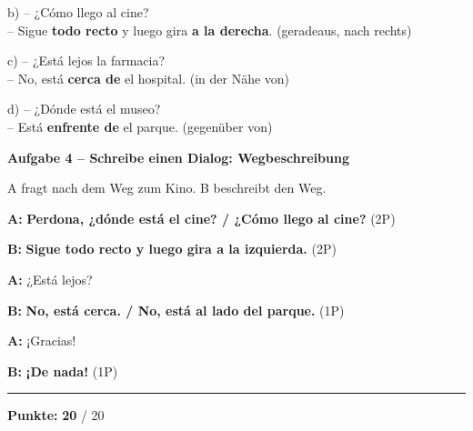 \documentclass[11pt, a4paper]{article}
\newcommand{\fachfarbe}{spanisch}
\newcommand{\maxpunkte}{20}
\newcommand{\punktebox}[1]{\hfill\fbox{\small \_/#1}}
\newcommand{\lsg}[1]{\textcolor{loesung}{\textbf{#1}}}
\newenvironment{aufgabe}[1]{%
    \needspace{5\baselineskip}%
    \nopagebreak[4]%
    \vspace{10pt}
    \noindent\textbf{\textcolor{\fachfarbe}{Aufgabe #1}}
    \nopagebreak[4]%
    \vspace{5pt}
    \nopagebreak[4]%
    \begin{list}{}{\leftmargin=0pt}
    \item[]
}{%
    \end{list}
}
\begin{document}
\vspace{0.8em}

\noindent
b) -- ¿Cómo llego al cine?\\
\hspace*{0.5cm} -- Sigue \lsg{todo recto} y luego gira \lsg{a la derecha}. (geradeaus, nach rechts)

\vspace{0.8em}

\noindent
c) -- ¿Está lejos la farmacia?\\
\hspace*{0.5cm} -- No, está \lsg{cerca de} el hospital. (in der Nähe von)

\vspace{0.8em}

\noindent
d) -- ¿Dónde está el museo?\\
\hspace*{0.5cm} -- Está \lsg{enfrente de} el parque. (gegenüber von)

\vspace{10pt}


\begin{aufgabe}{4 -- Schreibe einen Dialog: Wegbeschreibung}
A fragt nach dem Weg zum Kino. B beschreibt den Weg. \punktebox{6}
\end{aufgabe}

\noindent
\textbf{A:} \lsg{Perdona, ¿dónde está el cine? / ¿Cómo llego al cine?} (2P)

\vspace{0.8em}

\noindent
\textbf{B:} \lsg{Sigue todo recto y luego gira a la izquierda.} (2P)

\vspace{0.8em}

\noindent
\textbf{A:} ¿Está lejos?

\vspace{0.8em}

\noindent
\textbf{B:} \lsg{No, está cerca. / No, está al lado del parque.} (1P)

\vspace{0.8em}

\noindent
\textbf{A:} ¡Gracias!

\vspace{0.8em}

\noindent
\textbf{B:} \lsg{¡De nada!} (1P)


\vspace{20pt}
\hrule
\vspace{10pt}

\begin{flushright}
\textbf{Punkte:} \lsg{\maxpunkte} / \maxpunkte
\end{flushright}
\end{document}
